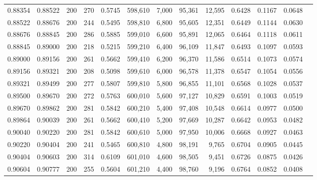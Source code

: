 \begin{tabular}{rrrrrrrrrrrrr}
0.88354 & 0.88522 &    200 & 270 &                                     0.5745 & 598,610 &   7,000 &  95,361 &  12,595 & 0.6428 & 0.1167 & 0.0648 \\
0.88522 & 0.88676 &    200 & 244 &                                     0.5495 & 598,810 &   6,800 &  95,605 &  12,351 & 0.6449 & 0.1144 & 0.0630 \\
0.88676 & 0.88845 &    200 & 286 &                                     0.5885 & 599,010 &   6,600 &  95,891 &  12,065 & 0.6464 & 0.1118 & 0.0611 \\
0.88845 & 0.89000 &    200 & 218 &                                     0.5215 & 599,210 &   6,400 &  96,109 &  11,847 & 0.6493 & 0.1097 & 0.0593 \\
0.89000 & 0.89156 &    200 & 261 &                                     0.5662 & 599,410 &   6,200 &  96,370 &  11,586 & 0.6514 & 0.1073 & 0.0574 \\
0.89156 & 0.89321 &    200 & 208 &                                     0.5098 & 599,610 &   6,000 &  96,578 &  11,378 & 0.6547 & 0.1054 & 0.0556 \\
0.89321 & 0.89499 &    200 & 277 &                                     0.5807 & 599,810 &   5,800 &  96,855 &  11,101 & 0.6568 & 0.1028 & 0.0537 \\
0.89500 & 0.89670 &    200 & 272 &                                     0.5763 & 600,010 &   5,600 &  97,127 &  10,829 & 0.6591 & 0.1003 & 0.0519 \\
0.89670 & 0.89862 &    200 & 281 &                                     0.5842 & 600,210 &   5,400 &  97,408 &  10,548 & 0.6614 & 0.0977 & 0.0500 \\
0.89864 & 0.90039 &    200 & 261 &                                     0.5662 & 600,410 &   5,200 &  97,669 &  10,287 & 0.6642 & 0.0953 & 0.0482 \\
0.90040 & 0.90220 &    200 & 281 &                                     0.5842 & 600,610 &   5,000 &  97,950 &  10,006 & 0.6668 & 0.0927 & 0.0463 \\
0.90220 & 0.90404 &    200 & 241 &                                     0.5465 & 600,810 &   4,800 &  98,191 &   9,765 & 0.6704 & 0.0905 & 0.0445 \\
0.90404 & 0.90603 &    200 & 314 &                                     0.6109 & 601,010 &   4,600 &  98,505 &   9,451 & 0.6726 & 0.0875 & 0.0426 \\
0.90604 & 0.90777 &    200 & 255 &                                     0.5604 & 601,210 &   4,400 &  98,760 &   9,196 & 0.6764 & 0.0852 & 0.0408 \\

\end{tabular}
